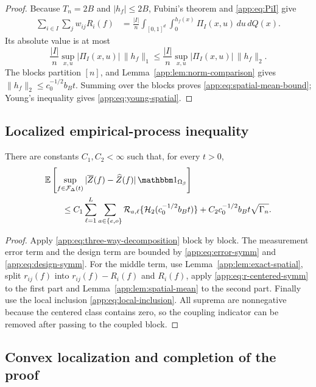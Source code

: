 \documentclass[twoside,11pt]{article}
\newenvironment{revision}{\color{revisionred}}{}
\begin{document}
\begin{revision}
\begin{proof}
Because $T_n=2B$ and $|h_f|\le2B$, Fubini's theorem and
\eqref{app:eq:PiI} give
\begin{align*}
 \sum_{i\in I}\sum_jw_{ij}R_i(f)
 &=\frac{|I|}{n}\int_{[0,1]^d}\int_0^{h_f(x)}\Pi_I(x,u)\,du\,dQ(x).
\end{align*}
Its absolute value is at most
\[
 \frac{|I|}{n}\sup_{x,u}|\Pi_I(x,u)|\,\|h_f\|_1
 \le\frac{|I|}{n}\sup_{x,u}|\Pi_I(x,u)|\,\|h_f\|_2.
\]
The blocks partition $[n]$, and Lemma~\ref{app:lem:norm-comparison} gives
$\|h_f\|_2\le c_0^{-1/2}b_Bt$.  Summing over the blocks proves
\eqref{app:eq:spatial-mean-bound}; Young's inequality gives
\eqref{app:eq:young-spatial}.
\end{proof}

\subsection{Localized empirical-process inequality}

\begin{proposition}
\label{app:prop:localized-process}
There are constants $C_1,C_2<\infty$ such that, for every $t>0$,
\begin{align}
 &\mathbb E\left[
 \sup_{f\in\mathcal F_\Delta(t)}
 |\overline Z(f)-\widehat Z(f)|\,\mathbbm 1_{\Omega_\beta}
 \right]\nonumber\\
 &\qquad\le
 C_1\sum_{\ell=1}^L\sum_{a\in\{e,o\}}
 \mathcal R_{a,\ell}\{\mathcal H_2(c_0^{-1/2}b_Bt)\}
 +C_2c_0^{-1/2}b_Bt\sqrt{\Gamma_n}.                            \label{app:eq:localized-process}
\end{align}
\end{proposition}

\begin{proof}
Apply \eqref{app:eq:three-way-decomposition} block by block.  The measurement
error term and the design term are bounded by
\eqref{app:eq:error-symm} and \eqref{app:eq:design-symm}.  For the middle term,
use Lemma~\ref{app:lem:exact-spatial}, split $r_{ij}(f)$ into
$r_{ij}(f)-R_i(f)$ and $R_i(f)$, apply
\eqref{app:eq:r-centered-symm} to the first part and
Lemma~\ref{app:lem:spatial-mean} to the second part.  Finally use the local
inclusion \eqref{app:eq:local-inclusion}.  All suprema are nonnegative because
the centered class contains zero, so the coupling indicator can be removed
after passing to the coupled block.
\end{proof}

\subsection{Convex localization and completion of the proof}


\end{revision}
\end{document}
